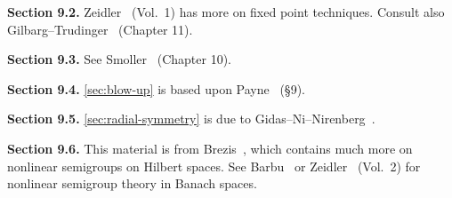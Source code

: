 \noindent\textbf{Section 9.2.} Zeidler~\cite{Zeidler1985} (Vol.~1) has more on fixed point techniques. Consult also Gilbarg--Trudinger~\cite{GilbargTrudinger1983} (Chapter 11).

\noindent\textbf{Section 9.3.} See Smoller~\cite{Smoller1983} (Chapter 10).

\noindent\textbf{Section 9.4.} \cref{sec:blow-up} is based upon Payne~\cite{Payne1975} (\S9).

\noindent\textbf{Section 9.5.} \cref{sec:radial-symmetry} is due to Gidas--Ni--Nirenberg~\cite{GidasNiNirenberg1979}.

\noindent\textbf{Section 9.6.} This material is from Brezis~\cite{Brezis1973}, which contains much more on nonlinear semigroups on Hilbert spaces. See Barbu~\cite{Barbu1976} or Zeidler~\cite{Zeidler1985} (Vol.~2) for nonlinear semigroup theory in Banach spaces.
